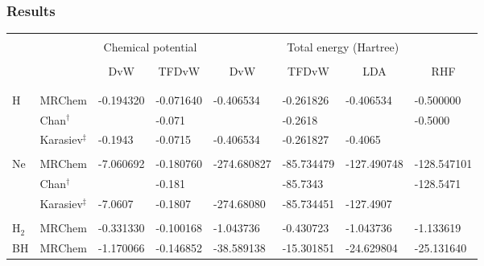 \documentclass[mathserif, 8pt]{beamer}
\begin{document}
\begin{frame}
    \frametitle{Results}
\begin{table}
\footnotesize
\begin{center}
\begin{tabular}{ll|ll|llll}
\hline
\hline
	&		    &               &               &               &               &               &		    \\
	&		    &\multicolumn{2}{|c|}{Chemical potential}&\multicolumn{4}{|c}{Total energy (Hartree)}\\
	&		    &               &               &               &               &               &		    \\
	&		    &
\multicolumn{1}{|c}{DvW}&
\multicolumn{1}{c|}{TFDvW}&
\multicolumn{1}{c}{DvW}&
\multicolumn{1}{c}{TFDvW}&
\multicolumn{1}{c}{LDA}&
\multicolumn{1}{c}{RHF}\\
	&		    &               &               &               &               &               &		    \\
\hline                                                      
	&		    &               &               &               &               &               &		    \\
H	& MRChem	    &  -0.194320    &  -0.071640    &   -0.406534   &  -0.261826    &   -0.406534   &   -0.500000   \\
	& Chan$^\dag$	    &		    &  -0.071	    &		    &  -0.2618      &		    &   -0.5000     \\
        & Karasiev$^\ddag$   &  -0.1943      &  -0.0715      &   -0.406534   &  -0.261827    &   -0.4065     &		    \\
	&		    &               &               &               &               &               &		    \\
Ne	& MRChem	    &  -7.060692    &  -0.180760    & -274.680827   & -85.734479    & -127.490748   & -128.547101   \\
	& Chan$^\dag$	    &		    &  -0.181       &		    & -85.7343      &		    & -128.5471     \\
	& Karasiev$^\ddag$   &  -7.0607	    &  -0.1807      & -274.68080    & -85.734451    & -127.4907	    &		    \\
	&		    &               &               &               &               &               &		    \\
H$_2$	& MRChem	    &  -0.331330    &  -0.100168    &   -1.043736   &  -0.430723    &   -1.043736   &   -1.133619   \\
BH	& MRChem	    &  -1.170066    &  -0.146852    &  -38.589138   & -15.301851    &  -24.629804   &  -25.131640   \\

\end{tabular}
\end{center}
\end{table}
\end{frame}
\end{document}
